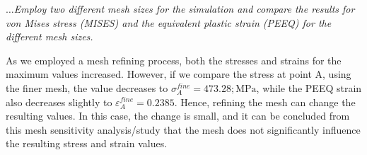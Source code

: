 \documentclass[12pt]{article}
\begin{document}
\textit{$\dots$Employ two different mesh sizes for the simulation and compare the results for von Mises
stress (MISES) and the equivalent plastic strain (PEEQ) for the different mesh sizes.}
\vspace{1em}

\hspace{2em}As we employed a mesh refining process, both the stresses and strains for the maximum values increased. 
However, if we compare the stress at point A, using the finer mesh, the value decreases to $\sigma_{A}^{fine} = 473.28 ; \text{MPa}$, 
while the PEEQ strain also decreases slightly to $\varepsilon_{A}^{fine} = 0.2385$. Hence, refining the mesh can change the resulting 
values. In this case, the change is small, and it can be concluded from this mesh sensitivity analysis/study that the mesh does not 
significantly influence the resulting stress and strain values. 
\end{document}
